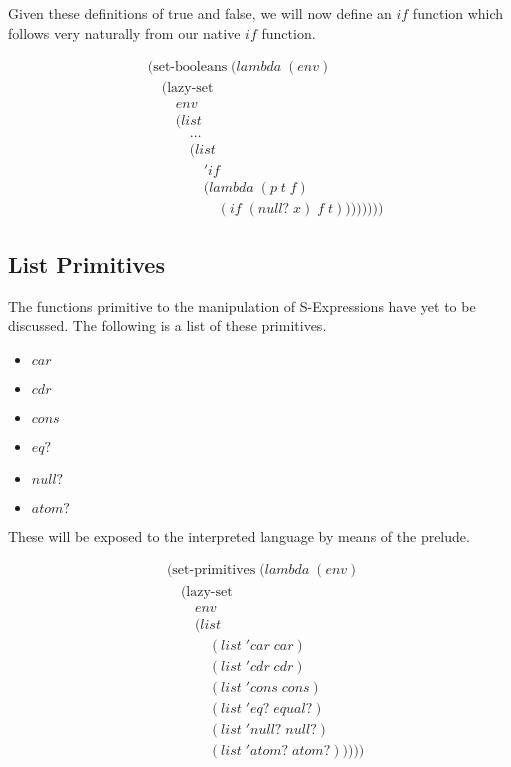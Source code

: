 Given these definitions of true and false, we will now define an $if$ 
function which follows very naturally from our native $if$ function.

\begin{figure}[htp]
\caption{}\label{fig:preludeIfDef}
\begin{align*}
& (\text{set-booleans} \; (lambda \; (env) \; 
\\& \quad (\text{lazy-set} \; 
\\& \qquad env
\\& \qquad (list \; 
\\& \qquad \quad \dots
\\& \qquad \quad (list
\\& \qquad \qquad 'if \; 
\\& \qquad \qquad (lambda \; (p \; t \; f)
\\& \qquad \qquad \quad (if \; (null? \; x) \; f \; t))))))))
\end{align*}
\end{figure}

\subsection{List Primitives}
The functions primitive to the manipulation of S-Expressions have yet to be 
discussed. The following is a list of these primitives.

\begin{itemize}
  \item $car$
  \item $cdr$
  \item $cons$
  \item $eq?$
  \item $null?$
  \item $atom?$
\end{itemize}

These will be exposed to the interpreted language by means of the prelude.

\begin{figure}[htp]
\caption{}\label{fig:preludePrimitives}
\begin{align*}
& (\text{set-primitives} \; (lambda \; (env)
\\& \quad (\text{lazy-set}
\\& \qquad env
\\& \qquad (list
\\& \qquad \quad (list \; 'car \; car)
\\& \qquad \quad (list \; 'cdr \; cdr)
\\& \qquad \quad (list \; 'cons \; cons)
\\& \qquad \quad (list \; 'eq? \; equal?)
\\& \qquad \quad (list \; 'null? \; null?)
\\& \qquad \quad (list \; 'atom? \; atom?)))))
\end{align*}
\end{figure}

